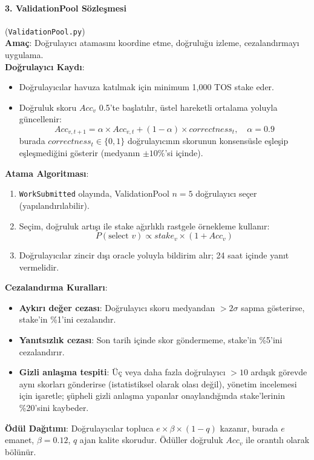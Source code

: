 \documentclass[11pt]{article}
\begin{document}
\paragraph{3. ValidationPool Sözleşmesi} (\texttt{ValidationPool.py})\\
\textbf{Amaç}: Doğrulayıcı atamasını koordine etme, doğruluğu izleme, cezalandırmayı uygulama.\\
\textbf{Doğrulayıcı Kaydı}:
\begin{itemize}[noitemsep]
  \item Doğrulayıcılar havuza katılmak için minimum 1,000 TOS stake eder.
  \item Doğruluk skoru $Acc_v$ 0.5'te başlatılır, üstel hareketli ortalama yoluyla güncellenir:
    \begin{equation}
    Acc_{v,t+1} = \alpha \times Acc_{v,t} + (1-\alpha) \times correctness_t, \quad \alpha = 0.9
    \end{equation}
    burada $correctness_t \in \{0,1\}$ doğrulayıcının skorunun konsensüsle eşleşip eşleşmediğini gösterir (medyanın $\pm10\%$'si içinde).
\end{itemize}
\textbf{Atama Algoritması}:
\begin{enumerate}[noitemsep]
  \item \texttt{WorkSubmitted} olayında, ValidationPool $n=5$ doğrulayıcı seçer (yapılandırılabilir).
  \item Seçim, doğruluk artışı ile stake ağırlıklı rastgele örnekleme kullanır:
    \begin{equation}
    P(\text{select } v) \propto stake_v \times (1 + Acc_v)
    \end{equation}
  \item Doğrulayıcılar zincir dışı oracle yoluyla bildirim alır; 24 saat içinde yanıt vermelidir.
\end{enumerate}
\textbf{Cezalandırma Kuralları}:
\begin{itemize}[noitemsep]
  \item \textbf{Aykırı değer cezası}: Doğrulayıcı skoru medyandan $>2\sigma$ sapma gösterirse, stake'in \%1'ini cezalandır.
  \item \textbf{Yanıtsızlık cezası}: Son tarih içinde skor göndermeme, stake'in \%5'ini cezalandırır.
  \item \textbf{Gizli anlaşma tespiti}: Üç veya daha fazla doğrulayıcı $>10$ ardışık görevde aynı skorları gönderirse (istatistiksel olarak olası değil), yönetim incelemesi için işaretle; şüpheli gizli anlaşma yapanlar onaylandığında stake'lerinin \%20'sini kaybeder.
\end{itemize}
\textbf{Ödül Dağıtımı}: Doğrulayıcılar topluca $e \times \beta \times (1-q)$ kazanır, burada $e$ emanet, $\beta=0.12$, $q$ ajan kalite skorudur. Ödüller doğruluk $Acc_v$ ile orantılı olarak bölünür.
\end{document}
